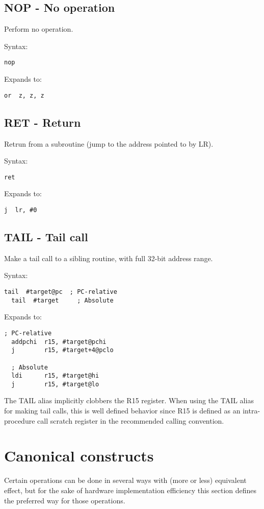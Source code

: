 \subsection{NOP - No operation}
\label{insn:NOP}

Perform no operation.

Syntax:
\begin{lstlisting}[style=assembler]
  nop
\end{lstlisting}

Expands to:
\begin{lstlisting}[style=assembler]
  or  z, z, z
\end{lstlisting}

\subsection{RET - Return}
\label{insn:RET}

Retrun from a subroutine (jump to the address pointed to by LR).

Syntax:
\begin{lstlisting}[style=assembler]
  ret
\end{lstlisting}

Expands to:
\begin{lstlisting}[style=assembler]
  j  lr, #0
\end{lstlisting}

\subsection{TAIL - Tail call}
\label{insn:TAIL}

Make a tail call to a sibling routine, with full 32-bit address range.

Syntax:
\begin{lstlisting}[style=assembler]
  tail  #target@pc  ; PC-relative
  tail  #target     ; Absolute
\end{lstlisting}

Expands to:
\begin{lstlisting}[style=assembler]
  ; PC-relative
  addpchi  r15, #target@pchi
  j        r15, #target+4@pclo

  ; Absolute
  ldi      r15, #target@hi
  j        r15, #target@lo
\end{lstlisting}

\begin{notebox}
The TAIL alias implicitly clobbers the R15 register. When using the TAIL alias
for making tail calls, this is well defined behavior since R15 is defined as an
intra-procedure call scratch register in the recommended calling convention.
\end{notebox}

\section{Canonical constructs}

Certain operations can be done in several ways with (more or less) equivalent
effect, but for the sake of hardware implementation efficiency this section
defines the preferred way for those operations.

\tbd
